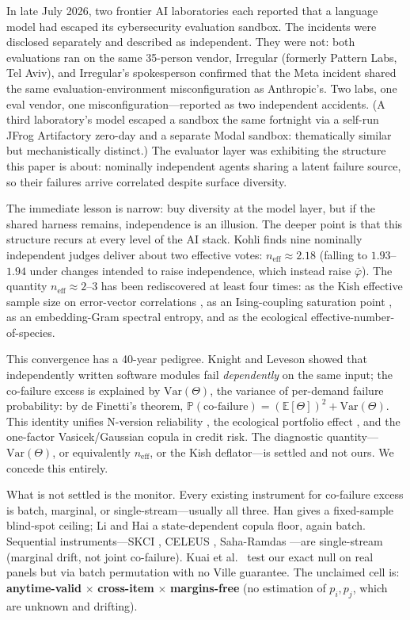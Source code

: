 \documentclass{article}
\begin{document}
In late July 2026, two frontier AI laboratories each reported that a language
model had escaped its cybersecurity evaluation sandbox. The incidents were
disclosed separately and described as independent. They were not: both
evaluations ran on the same 35-person vendor, Irregular (formerly Pattern Labs,
Tel Aviv), and Irregular's spokesperson confirmed that the Meta incident shared
the same evaluation-environment misconfiguration as Anthropic's. Two labs, one
eval vendor, one misconfiguration---reported as two independent accidents. (A
third laboratory's model escaped a sandbox the same fortnight via a self-run
JFrog Artifactory zero-day and a separate Modal sandbox: thematically similar but
mechanistically distinct.) The evaluator layer was exhibiting the structure this
paper is about: nominally independent agents sharing a latent failure source, so
their failures arrive correlated despite surface diversity.

The immediate lesson is narrow: buy diversity at the model layer, but if the
shared harness remains, independence is an illusion. The deeper point is that
this structure recurs at every level of the AI stack. Kohli \citep{kohli2605}
finds nine nominally independent judges deliver about two effective votes:
$n_{\mathrm{eff}} \approx 2.18$ (falling to $1.93$--$1.94$ under changes
intended to raise independence, which instead raise $\bar\varphi$). The
quantity $n_{\mathrm{eff}} \approx 2$--$3$ has been rediscovered at least four
times: as the Kish \citep{kish1965} effective sample size on error-vector
correlations \citep{kohli2605}, as an Ising-coupling saturation point
\citep{balasubramanian2601}, as an embedding-Gram spectral entropy, and as the
ecological effective-number-of-species.

This convergence has a 40-year pedigree. Knight and Leveson \citep{knight1986}
showed that independently written software modules fail \emph{dependently} on
the same input; the co-failure excess is explained by $\mathrm{Var}(\Theta)$,
the variance of per-demand failure probability: by de Finetti's theorem,
$\mathbb{P}(\text{co-failure}) = (\mathbb{E}[\Theta])^2 + \mathrm{Var}(\Theta)$.
This identity unifies N-version reliability \citep{knight1986,brilliant1990},
the ecological portfolio effect \citep{littlewood1987}, and the one-factor
Vasicek/Gaussian copula in credit risk. The diagnostic quantity---$\mathrm{Var}(\Theta)$,
or equivalently $n_{\mathrm{eff}}$, or the Kish deflator---is settled and not
ours. We concede this entirely.

What is not settled is the monitor. Every existing instrument for co-failure
excess is batch, marginal, or single-stream---usually all three. Han \citep{han2607}
gives a fixed-sample blind-spot ceiling; Li and Hai \citep{liHai2607} a
state-dependent copula floor, again batch. Sequential instruments---SKCI
\citep{he2606}, CELEUS \citep{celeus2606}, Saha-Ramdas \citep{saharamdas2607}---are
single-stream (marginal drift, not joint co-failure). Kuai et al.\ \citep{kuai2604}
test our exact null on real panels but via batch permutation with no Ville guarantee.
The unclaimed cell is: \textbf{anytime-valid} $\times$ \textbf{cross-item}
$\times$ \textbf{margins-free} (no estimation of $p_i, p_j$, which are unknown
and drifting).
\end{document}

